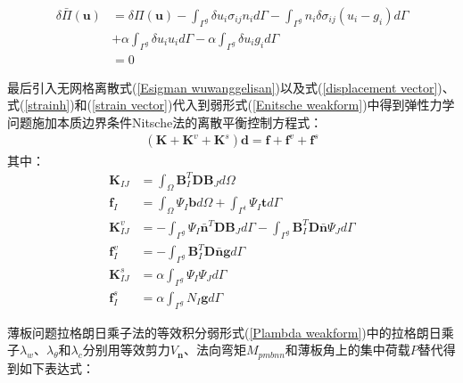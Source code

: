 \begin{equation}\label{Enitsche weakform}
\begin{split}
    \delta\bar{\Pi}(\pmb{u})&=\delta\Pi(\pmb{u})-\int_{\Gamma^g}\delta u_i\sigma_{ij}n_id\Gamma-\int_{\Gamma^g}n_i\delta\sigma_{ij}(u_i-g_i)d\Gamma\\
&+\alpha\int_{\Gamma^g}\delta u_iu_id\Gamma-\alpha\int_{\Gamma^g}\delta u_i g_id\Gamma\\
&=0
\end{split}
\end{equation}\par
最后引入无网格离散式(\ref{Esigman wuwanggelisan})以及式(\ref{displacement vector})、式(\ref{strainh})和(\ref{strain vector})代入到弱形式(\ref{Enitsche weakform})中得到弹性力学问题施加本质边界条件Nitsche法的离散平衡控制方程式：
\begin{equation}
\begin{split}
    (\pmb{K}+\pmb{K}^v+\pmb{K}^s)\pmb{d}=\pmb{f}+\pmb{f}^v+\pmb{f}^s
\end{split}
\end{equation}
其中：
\begin{subequations}
\begin{align}
   \pmb K_{I\!J}&=\int_{\Omega}\pmb{B}_I^T\pmb{D}\pmb{B}_Jd\Omega\\
   \pmb f_I&=\int_{\Omega}\Psi_I\pmb{b}d\Omega+\int_{\Gamma^t}\Psi_I\pmb{t}d\Gamma\\
    \pmb K^v_{I\!J}&=-\int_{\Gamma^g}\Psi_I\bar{\pmb{n}}^T\pmb{D}\pmb{B}_Jd\Gamma-\int_{\Gamma^g}\pmb{B}_I^T\pmb{D}\bar{\pmb{n}}\Psi_Jd\Gamma\\
    \pmb f^v_I&=-\int_{\Gamma^g}\pmb{B}_I^T\pmb{D}\bar{\pmb{n}}\pmb{g}d\Gamma\\
   \pmb K^s_{I\!J}&=\alpha\int_{\Gamma^g}\Psi_I\Psi_Jd\Gamma\\
   \pmb f^s_I&=\alpha\int_{\Gamma^g}N_I\pmb{g}d\Gamma
\end{align}
\end{subequations}\par
薄板问题拉格朗日乘子法的等效积分弱形式(\ref{Plambda weakform})中的拉格朗日乘子$\lambda_w$、$\lambda_\theta$和$\lambda_c$分别用等效剪力$V_{\pmb n}$、法向弯矩$M_{pmb{nn}}$和薄板角上的集中荷载$P$替代得到如下表达式：

